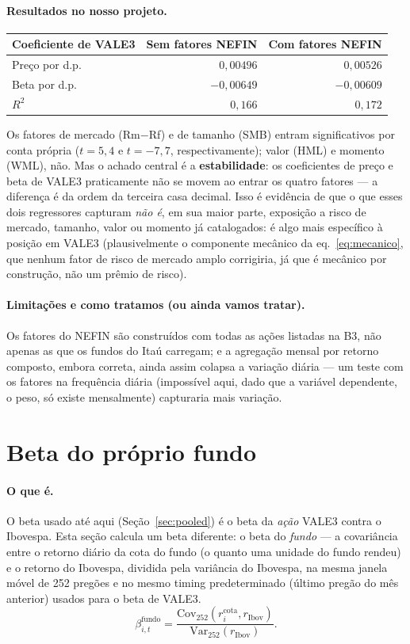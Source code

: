 \documentclass[11pt,a4paper]{article}
\newcommand{\oquee}[0]{\paragraph{O que é.}}
\newcommand{\resultados}[0]{\paragraph{Resultados no nosso projeto.}}
\newcommand{\limitacoes}[0]{\paragraph{Limitações e como tratamos (ou ainda vamos tratar).}}
\begin{document}
\resultados
\begin{center}\small
\begin{tabular}{@{}lrr@{}}
\toprule
Coeficiente de VALE3 & Sem fatores NEFIN & Com fatores NEFIN \\
\midrule
Preço por d.p. & $0{,}00496$ & $0{,}00526$ \\
Beta por d.p.  & $-0{,}00649$ & $-0{,}00609$ \\
\midrule
$R^2$ & $0{,}166$ & $0{,}172$ \\
\bottomrule
\end{tabular}
\end{center}
Os fatores de mercado (Rm$-$Rf) e de tamanho (SMB) entram significativos por conta própria
($t=5{,}4$ e $t=-7{,}7$, respectivamente); valor (HML) e momento (WML), não. Mas o achado central
é a \textbf{estabilidade}: os coeficientes de preço e beta de VALE3 praticamente não se movem ao
entrar os quatro fatores --- a diferença é da ordem da terceira casa decimal. Isso é evidência de
que o que esses dois regressores capturam \emph{não é}, em sua maior parte, exposição a risco de
mercado, tamanho, valor ou momento já catalogados: é algo mais específico à posição em VALE3
(plausivelmente o componente mecânico da eq.~\ref{eq:mecanico}, que nenhum fator de risco de
mercado amplo corrigiria, já que é mecânico por construção, não um prêmio de risco).

\limitacoes Os fatores do NEFIN são construídos com todas as ações listadas na B3, não apenas as
que os fundos do Itaú carregam; e a agregação mensal por retorno composto, embora correta, ainda
assim colapsa a variação diária --- um teste com os fatores na frequência diária (impossível
aqui, dado que a variável dependente, o peso, só existe mensalmente) capturaria mais variação.

\section{Beta do próprio fundo}
\label{sec:betafundo}

\oquee O beta usado até aqui (Seção~\ref{sec:pooled}) é o beta da \emph{ação} VALE3 contra o
Ibovespa. Esta seção calcula um beta diferente: o beta do \emph{fundo} --- a covariância entre o
retorno diário da cota do fundo (o quanto uma unidade do fundo rendeu) e o retorno do Ibovespa,
dividida pela variância do Ibovespa, na mesma janela móvel de 252 pregões e no mesmo timing
predeterminado (último pregão do mês anterior) usados para o beta de VALE3.
\begin{equation}
\beta^{\text{fundo}}_{i,t} = \frac{\mathrm{Cov}_{252}(r^{\text{cota}}_{i}, r_{\text{Ibov}})}
{\mathrm{Var}_{252}(r_{\text{Ibov}})}.
\end{equation}
\end{document}
